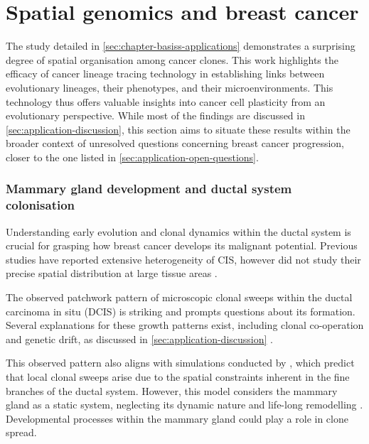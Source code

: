 \section{Spatial genomics and breast cancer}

The study detailed in \cref{sec:chapter-basiss-applications} demonstrates a surprising degree of spatial organisation among cancer clones. This work highlights the efficacy of cancer lineage tracing technology in establishing links between evolutionary lineages, their phenotypes, and their microenvironments. This technology thus offers valuable insights into cancer cell plasticity from an evolutionary perspective. While most of the findings are discussed in \cref{sec:application-discussion}, this section aims to situate these results within the broader context of unresolved questions concerning breast cancer progression, closer to the one listed in \cref{sec:application-open-questions}.


\subsubsection*{Mammary gland development and ductal system colonisation}

Understanding early evolution and clonal dynamics within the ductal system is crucial for grasping how breast cancer develops its malignant potential. Previous studies have reported extensive heterogeneity of \acf{CIS}, however did not study their precise spatial distribution at large tissue areas \parencite{Casasent2018-gx,Nishimura2023-mk,Yates2015-xk}. 

The observed patchwork pattern of microscopic clonal sweeps within the ductal carcinoma in situ (\ac{DCIS}) is striking and prompts questions about its formation. Several explanations for these growth patterns exist, including clonal co-operation and genetic drift, as discussed in \cref{sec:application-discussion} \parencite{Janiszewska2019-zq,Turajlic2019-sr}.

This observed pattern also aligns with simulations conducted by \textcite{West2021-ar}, which predict that local clonal sweeps arise due to the spatial constraints inherent in the fine branches of the ductal system. However, this model considers the mammary gland as a static system, neglecting its dynamic nature and life-long remodelling . Developmental processes within the mammary gland could play a role in clone spread.

